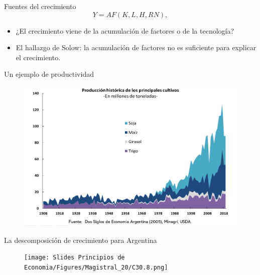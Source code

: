 \documentclass{beamer}
\begin{document}
\begin{frame}{Fuentes del crecimiento}
   \begin{equation*}
    Y = AF(K,L,H,RN),
\end{equation*} 
\begin{itemize}
    \item ¿El crecimiento viene de la acumulación de factores o de la tecnología?
    \item El hallazgo de Solow: la acumulación de factores no es suficiente para explicar el crecimiento.
\end{itemize}
\end{frame}

\begin{frame}{Un ejemplo de productividad}
    \begin{figure} [H]   \includegraphics[scale=0.55]{Slides Principios de Economia/Figures/C17.3.png}
\label{fig:17.3}
\end{figure}
\end{frame}


\begin{frame}{La descomposición de crecimiento para Argentina}
    \begin{figure} [H]   
    \texttt{[image: Slides Principios de Economia/Figures/Magistral\_20/C30.8.png]}
\end{figure}
\end{frame}
\end{document}
